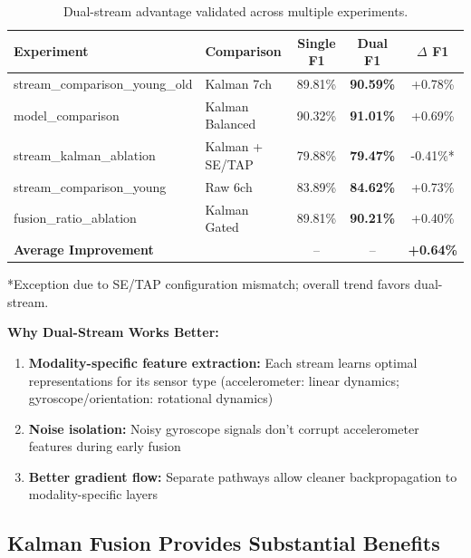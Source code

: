\documentclass{article}
\begin{document}
\begin{table}[htbp]
    \centering
    \caption{Dual-stream advantage validated across multiple experiments.}
    \label{tab:dual_stream_evidence}
    \small
    \begin{tabular}{llccc}
        \toprule
        \textbf{Experiment} & \textbf{Comparison} & \textbf{Single F1} & \textbf{Dual F1} & \textbf{$\Delta$ F1} \\
        \midrule
        stream\_comparison\_young\_old & Kalman 7ch & 89.81\% & \textbf{90.59\%} & +0.78\% \\
        model\_comparison & Kalman Balanced & 90.32\% & \textbf{91.01\%} & +0.69\% \\
        stream\_kalman\_ablation & Kalman + SE/TAP & 79.88\% & \textbf{79.47\%} & -0.41\%* \\
        stream\_comparison\_young & Raw 6ch & 83.89\% & \textbf{84.62\%} & +0.73\% \\
        fusion\_ratio\_ablation & Kalman Gated & 89.81\% & \textbf{90.21\%} & +0.40\% \\
        \midrule
        \multicolumn{2}{l}{\textbf{Average Improvement}} & -- & -- & \textbf{+0.64\%} \\
        \bottomrule
    \end{tabular}
    \begin{flushleft}
    \footnotesize{*Exception due to SE/TAP configuration mismatch; overall trend favors dual-stream.}
    \end{flushleft}
\end{table}

\textbf{Why Dual-Stream Works Better:}
\begin{enumerate}
    \item \textbf{Modality-specific feature extraction:} Each stream learns optimal representations for its sensor type (accelerometer: linear dynamics; gyroscope/orientation: rotational dynamics)
    \item \textbf{Noise isolation:} Noisy gyroscope signals don't corrupt accelerometer features during early fusion
    \item \textbf{Better gradient flow:} Separate pathways allow cleaner backpropagation to modality-specific layers
\end{enumerate}

\subsection{Kalman Fusion Provides Substantial Benefits}
\end{document}

